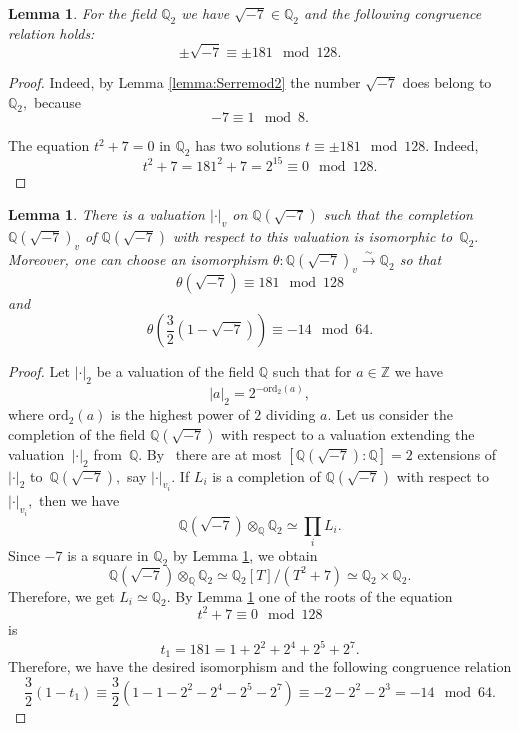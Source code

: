 \documentclass{amsart}
\makeatletter
\numberwithin{equation}{section}
\newtheorem{Lemma}[subsection]{Lemma}
\theoremstyle{definition}
\newcommand*{\rom}[1]{\expandafter\@slowromancap\romannumeral #1@}
\makeatother
\begin{document}
\begin{Lemma}\label{lemma:sqrt-7}
For the field  $\mathbb{Q}_2$ we have $\sqrt{-7} \in \mathbb{Q}_2$ and the following congruence relation holds:
$$
\pm \sqrt{-7} \equiv \pm 181 \mod 128.
$$
\end{Lemma}

\begin{proof}
Indeed, by Lemma \ref{lemma:Serremod2} the number $\sqrt{-7}$ does belong to $\mathbb{Q}_2,$ because 
$$
-7 \equiv 1 \mod 8.
$$

\noindent The equation $t^2+7=0$ in $\mathbb{Q}_2$ has two solutions $t \equiv \pm 181 \mod 128.$  Indeed,
$$
t^2+7=181^2+7=2^{15} \equiv 0 \mod 128.
$$
\end{proof}


\begin{Lemma}\label{lemma:completeQ2}
There is a valuation $|\cdot|_v$ on  $\mathbb{Q}(\sqrt{-7})$ such that the completion~$\mathbb{Q}(\sqrt{-7})_v$ of   $\mathbb{Q}(\sqrt{-7})$ with respect to this valuation is isomorphic to~$\mathbb{Q}_2.$ Moreover, one can choose an isomorphism $\theta:\mathbb{Q}(\sqrt{-7})_{v} \xrightarrow{\sim} \mathbb{Q}_2$ so that
$$
\theta(\sqrt{-7}) \equiv 181 \mod 128
$$
\noindent and 
$$
\theta\left(\frac{3}{2}(1-\sqrt{-7})\right) \equiv -14 \mod 64.
$$ 
\end{Lemma}

\begin{proof}
Let $|\cdot|_2$ be a valuation of the field $\mathbb{Q}$ such that for $a \in \mathbb{Z}$ we have
$$
|a|_2=2^{-\mathrm{ord}_2(a)},
$$
\noindent where $\mathrm{ord}_2(a)$ is the highest power of $2$ dividing $a.$ Let us consider the completion of the field $\mathbb{Q}(\sqrt{-7})$ with respect to a valuation extending the valuation~$|\cdot|_2$ from~$\mathbb{Q}.$ By~\cite[Chapter \rom{2}, \S 10]{Frohlich} there are at most $[\mathbb{Q}(\sqrt{-7}):\mathbb{Q}]=2$ extensions of~$|\cdot|_2$ to~$\mathbb{Q}(\sqrt{-7}),$ say $|\cdot|_{v_i}.$ If $L_i$ is a completion of $\mathbb{Q}(\sqrt{-7})$ with respect to~$|\cdot|_{v_i},$ then we have 
$$
\mathbb{Q}(\sqrt{-7}) \otimes_{\mathbb{Q}}\mathbb{Q}_2 \simeq \prod_i L_i.
$$
\noindent Since  $-7$ is a square in $\mathbb{Q}_2$ by Lemma \ref{lemma:sqrt-7}, we obtain
\begin{equation}\label{eq:completionoffield}
\mathbb{Q}(\sqrt{-7}) \otimes_{\mathbb{Q}}\mathbb{Q}_2 \simeq \mathbb{Q}_2[T]/(T^2+7) \simeq \mathbb{Q}_2 \times \mathbb{Q}_2. 
\end{equation}
\noindent Therefore, we get $L_i \simeq \mathbb{Q}_2.$  By Lemma \ref{lemma:sqrt-7} one of the roots of the equation 
$$
t^2+7 \equiv 0 \mod 128
$$
 is 
$$
t_1=181=1+2^2+2^4+2^5+2^7.
$$
\noindent Therefore, we have the desired isomorphism and the following congruence relation
\begin{equation}\label{eq:3/2+}
\frac{3}{2}(1-t_1) \equiv \frac{3}{2}(1-1-2^2-2^4-2^5-2^7) \equiv -2-2^2-2^3=-14 \mod 64.
\end{equation}

\end{proof}
\end{document}
